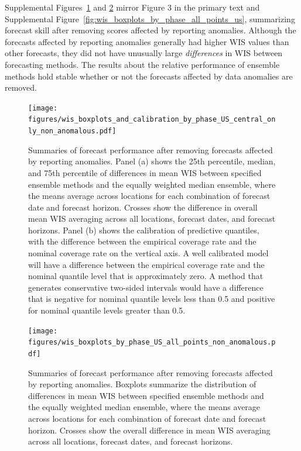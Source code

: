 \documentclass{article}
\begin{document}
Supplemental Figures~\ref{fig:wis_calibration_us_non_anomalous} and \ref{fig:wis_calibration_us_non_anomalous_all_points} mirror Figure 3 in the primary text and Supplemental Figure~\ref{fig:wis_boxplots_by_phase_all_points_us}, summarizing forecast skill after removing scores affected by reporting anomalies. Although the forecasts affected by reporting anomalies generally had higher WIS values than other forecasts, they did not have unusually large \textit{differences} in WIS between forecasting methods. The results about the relative performance of ensemble methods hold stable whether or not the forecasts affected by data anomalies are removed.

\newpage

\begin{figure}[H]
  \texttt{[image: figures/wis\_boxplots\_and\_calibration\_by\_phase\_US\_central\_only\_non\_anomalous.pdf]}
  \caption{Summaries of forecast performance after removing forecasts affected by reporting anomalies. Panel (a) shows the 25th percentile, median, and 75th percentile of differences in mean WIS between specified ensemble methods and the equally weighted median ensemble, where the means average across locations for each combination of forecast date and forecast horizon. Crosses show the difference in overall mean WIS averaging across all locations, forecast dates, and forecast horizons. Panel (b) shows the calibration of predictive quantiles, with the difference between the empirical coverage rate and the nominal coverage rate on the vertical axis. A well calibrated model will have a difference between the empirical coverage rate and the nominal quantile level that is approximately zero. A method that generates conservative two-sided intervals would have a difference that is negative for nominal quantile levels less than 0.5 and positive for nominal quantile levels greater than 0.5.}
  \label{fig:wis_calibration_us_non_anomalous}
\end{figure}

\begin{figure}[H]
  \texttt{[image: figures/wis\_boxplots\_by\_phase\_US\_all\_points\_non\_anomalous.pdf]}
  \caption{Summaries of forecast performance after removing forecasts affected by reporting anomalies. Boxplots summarize the distribution of differences in mean WIS between specified ensemble methods and the equally weighted median ensemble, where the means average across locations for each combination of forecast date and forecast horizon. Crosses show the overall difference in mean WIS averaging across all locations, forecast dates, and forecast horizons.}
  \label{fig:wis_calibration_us_non_anomalous_all_points}
\end{figure}
\end{document}
